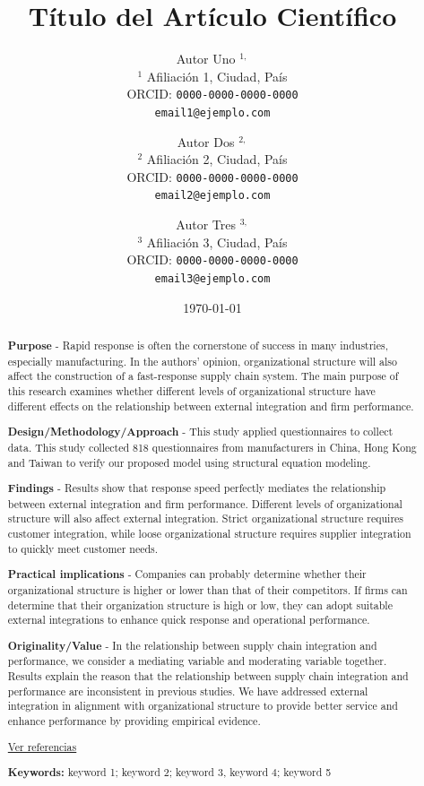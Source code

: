 \documentclass[a4paper,12pt]{article}
\title{\textbf{Título del Artículo Científico}}
\author{
Autor Uno $^{1,}$ \\
\small $^1$ Afiliación 1, Ciudad, País \\
\small ORCID: \texttt{0000-0000-0000-0000} \\
\small \texttt{email1@ejemplo.com} 
\and
Autor Dos $^{2,}$ \\
\small $^2$ Afiliación 2, Ciudad, País \\
\small ORCID: \texttt{0000-0000-0000-0000} \\
\small \texttt{email2@ejemplo.com} 
\and
Autor Tres $^{3,}$\\
\small $^3$ Afiliación 3, Ciudad, País \\
\small ORCID: \texttt{0000-0000-0000-0000} \\
\small \texttt{email3@ejemplo.com} 
}
\date{\today}
\begin{document}
\maketitle

\begin{abstract}
\textbf{Purpose} - Rapid response is often the cornerstone of success in many industries, especially manufacturing. In the authors’ opinion, organizational structure will also affect the construction of a fast-response supply chain system. The main purpose of this research examines whether different levels of organizational structure have different effects on the relationship between external integration and firm performance. 

 \textbf{Design/Methodology/Approach} - This study applied questionnaires to collect data. This study collected 818 questionnaires from manufacturers in China, Hong Kong and Taiwan to verify our proposed model using structural equation modeling.

\textbf{Findings} - Results show that response speed perfectly mediates the relationship between external integration and firm performance. Different levels of organizational structure will also affect external integration. Strict organizational structure requires customer integration, while loose organizational structure requires supplier integration to quickly meet customer needs.

\textbf{Practical implications} - Companies can probably determine whether their organizational structure is higher or lower than that of their competitors. If firms can determine that their organization structure is high or low, they can adopt suitable external integrations to enhance quick response and operational performance.

\textbf{Originality/Value} - In the relationship between supply chain integration and performance, we consider a mediating variable and moderating variable together. Results explain the reason that the relationship between supply chain integration and performance are inconsistent in previous studies. We have addressed external integration in alignment with organizational structure to provide better service and enhance performance by providing empirical evidence.

\href{https://www.cyta.com.ar/biblioteca/bddoc/bdlibros/ciencia_alto_impacto.htm#x5-3}{Ver referencias}

\textbf{Keywords:} keyword 1; keyword 2; keyword 3, keyword 4; keyword 5

\end{abstract}
\end{document}
